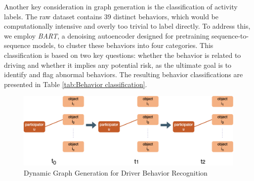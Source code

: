 Another key consideration in graph generation is the classification of activity labels. The raw dataset contains 39 distinct behaviors, which would be computationally intensive and overly too trivial to label directly. To address this, we employ \textit{BART}, a denoising autoencoder designed for pretraining sequence-to-sequence models, to cluster these behaviors into four categories. This classification is based on two key questions: whether the behavior is related to driving and whether it implies any potential risk, as the ultimate goal is to identify and flag abnormal behaviors. The resulting behavior classifications are presented in Table \ref{tab:Behavior classification}.

\begin{figure}[h]
    \centering
    \includegraphics[width=\linewidth]{figures/04_DynamicGraph.png}
    \caption{Dynamic Graph Generation for Driver Behavior Recognition}
    \label{fig:DynamicGraph}
\end{figure}



